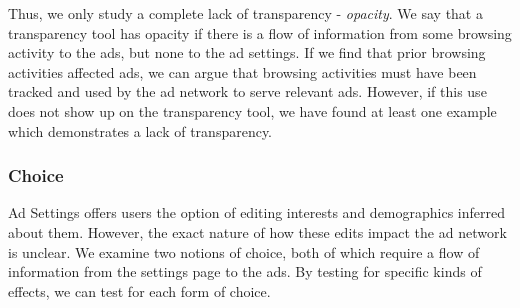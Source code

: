 \documentclass[10pt, onecolumn]{report}
\begin{document}

Thus, we only study a complete lack of transparency - \emph{opacity}. 
We say that a transparency tool has opacity if there is a flow of information
from some browsing activity to the ads, but none to the ad settings. 
If we find that prior browsing activities affected ads, we can argue that browsing activities 
must have been tracked and used by the ad network to serve relevant ads. 
However, if this use does not show up on the transparency tool, we have 
found at least one example which %
demonstrates a lack of transparency. 

\subsubsection{Choice}


Ad Settings offers users the option of editing interests and 
demographics inferred about them.
However, the exact nature of how these edits impact the ad network is unclear. 
We examine two notions of choice, both of which require a flow of information 
from the settings page to the ads. By testing for specific kinds of effects, 
we can test for each form of choice. 
\end{document}

